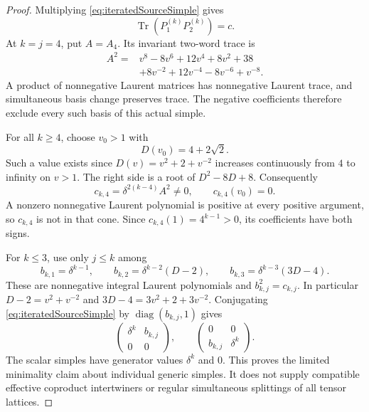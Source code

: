 \begin{proof}
Multiplying \eqref{eq:iteratedSourceSimple} gives
\[
 \operatorname{Tr}(P_1^{(k)}P_2^{(k)})=c.
\]
At \(k=j=4\), put \(A=A_4\). Its invariant two-word trace is
\begin{equation}\label{eq:iteratedNegativeTrace}
 \begin{split}
 A^2={}&v^8-8v^6+12v^4+8v^2+38\\
       &+8v^{-2}+12v^{-4}-8v^{-6}+v^{-8}.
 \end{split}
\end{equation}
A product of nonnegative Laurent matrices has nonnegative
Laurent trace, and simultaneous basis change preserves trace.
The negative coefficients therefore exclude every such basis
of this actual simple.

For all \(k\ge4\), choose \(v_0>1\) with
\[
 D(v_0)=4+2\sqrt2.
\]
Such a value exists since \(D(v)=v^2+2+v^{-2}\)
increases continuously from \(4\) to infinity on \(v>1\).
The right side is a root of \(D^2-8D+8\). Consequently
\[
 c_{k,4}=\delta^{2(k-4)}A^2\ne0,\qquad c_{k,4}(v_0)=0.
\]
A nonzero nonnegative Laurent polynomial is positive at
every positive argument, so \(c_{k,4}\) is not in that cone.
Since \(c_{k,4}(1)=4^{k-1}>0\), its coefficients have both signs.

For \(k\le3\), use only \(j\le k\) among
\[
 b_{k,1}=\delta^{k-1},\qquad
 b_{k,2}=\delta^{k-2}(D-2),\qquad
 b_{k,3}=\delta^{k-3}(3D-4).
\]
These are nonnegative integral Laurent polynomials and
\(b_{k,j}^2=c_{k,j}\). In particular
\(D-2=v^2+v^{-2}\) and \(3D-4=3v^2+2+3v^{-2}\).
Conjugating \eqref{eq:iteratedSourceSimple} by
\(\operatorname{diag}(b_{k,j},1)\) gives
\[
 \begin{pmatrix}\delta^k&b_{k,j}\\0&0\end{pmatrix},
 \qquad
 \begin{pmatrix}0&0\\b_{k,j}&\delta^k\end{pmatrix}.
\]
The scalar simples have generator values \(\delta^k\) and \(0\).
This proves the limited minimality claim about individual
generic simples. It does not supply compatible effective
coproduct intertwiners or regular simultaneous splittings
of all tensor lattices.


\end{proof}

